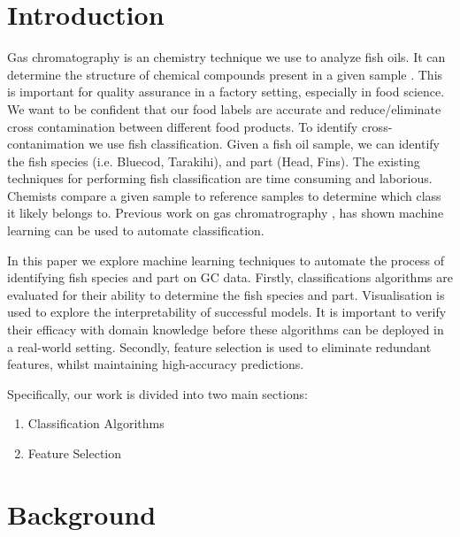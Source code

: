 \documentclass[runningheads]{llncs}
\begin{document}
\section{Introduction}


Gas chromatography \cite{eder1995gas} is an chemistry technique we use to analyze fish oils. 
It can determine the structure of chemical compounds present in a given sample \cite{restek2018high}. 
This is important for quality assurance in a factory setting, especially in food science. 
We want to be confident that our food labels are accurate and reduce/eliminate cross contamination between different food products. 
To identify cross-contanimation we use fish classification. 
Given a fish oil sample, we can identify the fish species (i.e. Bluecod, Tarakihi), and part (Head, Fins).
The existing techniques for performing fish classification are time consuming and laborious. 
Chemists compare a given sample to reference samples to determine which class it likely belongs to. 
Previous work on gas chromatrography \cite{bi2020gc,matyushin2020gas}, has shown machine learning can be used to automate classification. 

In this paper we explore machine learning techniques to automate the process of identifying fish species and part on GC data. 
Firstly, classifications algorithms are evaluated for their ability to determine the fish species and part. 
Visualisation is used to explore the interpretability of successful models.
It is important to verify their efficacy with domain knowledge before these algorithms can be deployed in a real-world setting.
Secondly, feature selection is used to eliminate redundant features, whilst maintaining high-accuracy predictions. 

Specifically, our work is divided into two main sections: 
\begin{enumerate}
  \item Classification Algorithms
  \item Feature Selection
\end{enumerate}

\section{Background}
\end{document}
